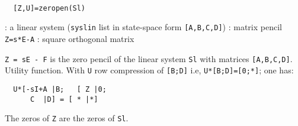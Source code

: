 \begin{mandesc}
   \\ %
\end{mandesc}
\begin{calling_sequence}
\begin{verbatim}
  [Z,U]=zeropen(Sl)  
\end{verbatim}
\end{calling_sequence}
\begin{parameters}
  \begin{varlist}
    : a linear system (\verb!syslin! list in state-space form \verb![A,B,C,D]!)
    : matrix pencil \verb!Z=s*E-A!
    : square orthogonal matrix
  \end{varlist}
\end{parameters}
\begin{mandescription}
  \verb!Z = sE - F!  is the zero pencil of the linear system \verb!Sl! with 
  matrices \verb![A,B,C,D]!. Utility function.
  With \verb!U! row compression of \verb![B;D]! i.e, \verb!U*[B;D]=[0;*]!; one has:
\begin{verbatim}
  U*[-sI+A |B;   [ Z |0;      
      C  |D] = [ * |*]
\end{verbatim}
The zeros of \verb!Z! are the zeros of \verb!Sl!.
\end{mandescription}
\begin{manseealso}
     
\end{manseealso}
